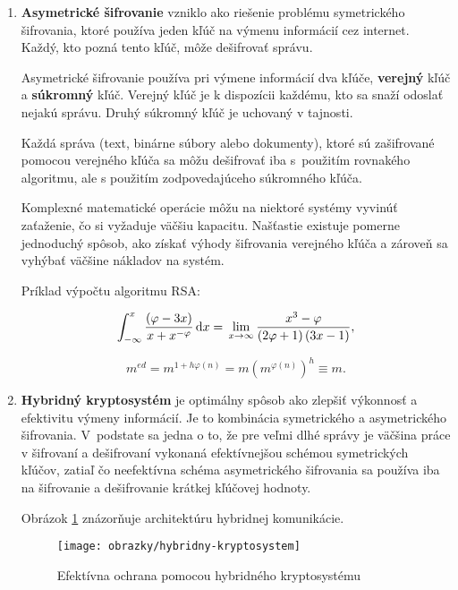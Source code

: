 \begin{enumerate}
\item \textbf{Asymetrické šifrovanie} vzniklo ako riešenie problému symetrického šifrovania, ktoré používa jeden kľúč na výmenu informácií cez internet. Každý, kto pozná tento kľúč, môže dešifrovať správu.

Asymetrické šifrovanie používa pri výmene informácií dva kľúče, \textbf{verejný} kľúč a \textbf{súkromný} kľúč. Verejný kľúč je k dispozícii každému, kto sa snaží odoslať nejakú správu. Druhý súkromný kľúč je uchovaný v tajnosti. 

Každá správa (text, binárne súbory alebo dokumenty), ktoré sú zašifrované pomocou verejného kľúča sa môžu dešifrovať iba s~použitím rovnakého algoritmu, ale s použitím zodpovedajúceho súkromného kľúča.

Komplexné matematické operácie môžu na niektoré systémy vyvinúť zaťaženie, čo si vyžaduje väčšiu kapacitu. Našťastie existuje pomerne jednoduchý spôsob, ako získať výhody šifrovania verejného kľúča a zároveň sa vyhýbať väčšine nákladov na systém.

Príklad výpočtu algoritmu RSA:



\begin{equation}
\label{integral}
	\int_{-\infty}^{x} \frac{\left(\varphi - 3x\right)}{x + x^{-\varphi}} \, \mathrm d x  =\, 
	\lim_{x\rightarrow \infty} \frac{x^3-\varphi}{\left(2 \varphi + 1\right) \left(3x -1\right)},
\end{equation}

\begin{equation}
\label{rsa}
 	m^{ed} = m^{1+h \varphi(n)} = m(m^{\varphi(n)})^h \equiv m.
\end{equation}

\item \textbf{Hybridný kryptosystém} je optimálny spôsob ako zlepšiť výkonnosť a efektivitu výmeny informácií. Je to kombinácia symetrického a asymetrického šifrovania. V~podstate sa jedna o to, že pre veľmi dlhé správy je väčšina práce v šifrovaní a de\-šifro\-va\-ní vykonaná efektívnejšou schémou symetrických kľúčov, zatiaľ čo neefektívna schéma asymetrického šifrovania sa používa iba na šifrovanie a dešifrovanie krátkej kľúčovej hodnoty.

Obrázok \ref{hybridny-kryptosystem} znázorňuje architektúru hybridnej komunikácie.

\begin{figure}[!h]
    \centering
    \texttt{[image: obrazky/hybridny-kryptosystem]}
    \caption{Efektívna ochrana pomocou hybridného kryptosystému}
    \label{hybridny-kryptosystem}
\end{figure}

\end{enumerate}

